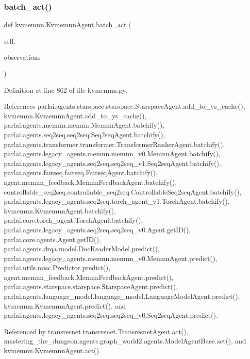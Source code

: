 \subsubsection{\texorpdfstring{batch\+\_\+act()}{batch\_act()}}
{\footnotesize\ttfamily def kvmemnn.\+Kvmemnn\+Agent.\+batch\+\_\+act (\begin{DoxyParamCaption}\item[{}]{self,  }\item[{}]{observations }\end{DoxyParamCaption})}



Definition at line 862 of file kvmemnn.\+py.



References parlai.\+agents.\+starspace.\+starspace.\+Starspace\+Agent.\+add\+\_\+to\+\_\+ys\+\_\+cache(), kvmemnn.\+Kvmemnn\+Agent.\+add\+\_\+to\+\_\+ys\+\_\+cache(), parlai.\+agents.\+memnn.\+memnn.\+Memnn\+Agent.\+batchify(), parlai.\+agents.\+seq2seq.\+seq2seq.\+Seq2seq\+Agent.\+batchify(), parlai.\+agents.\+transformer.\+transformer.\+Transformer\+Ranker\+Agent.\+batchify(), parlai.\+agents.\+legacy\+\_\+agents.\+memnn.\+memnn\+\_\+v0.\+Memnn\+Agent.\+batchify(), parlai.\+agents.\+legacy\+\_\+agents.\+seq2seq.\+seq2seq\+\_\+v1.\+Seq2seq\+Agent.\+batchify(), parlai.\+agents.\+fairseq.\+fairseq.\+Fairseq\+Agent.\+batchify(), agent.\+memnn\+\_\+feedback.\+Memnn\+Feedback\+Agent.\+batchify(), controllable\+\_\+seq2seq.\+controllable\+\_\+seq2seq.\+Controllable\+Seq2seq\+Agent.\+batchify(), parlai.\+agents.\+legacy\+\_\+agents.\+seq2seq.\+torch\+\_\+agent\+\_\+v1.\+Torch\+Agent.\+batchify(), kvmemnn.\+Kvmemnn\+Agent.\+batchify(), parlai.\+core.\+torch\+\_\+agent.\+Torch\+Agent.\+batchify(), parlai.\+agents.\+legacy\+\_\+agents.\+seq2seq.\+seq2seq\+\_\+v0.\+Agent.\+get\+I\+D(), parlai.\+core.\+agents.\+Agent.\+get\+I\+D(), parlai.\+agents.\+drqa.\+model.\+Doc\+Reader\+Model.\+predict(), parlai.\+agents.\+legacy\+\_\+agents.\+memnn.\+memnn\+\_\+v0.\+Memnn\+Agent.\+predict(), parlai.\+utils.\+misc.\+Predictor.\+predict(), agent.\+memnn\+\_\+feedback.\+Memnn\+Feedback\+Agent.\+predict(), parlai.\+agents.\+starspace.\+starspace.\+Starspace\+Agent.\+predict(), parlai.\+agents.\+language\+\_\+model.\+language\+\_\+model.\+Language\+Model\+Agent.\+predict(), kvmemnn.\+Kvmemnn\+Agent.\+predict(), and parlai.\+agents.\+legacy\+\_\+agents.\+seq2seq.\+seq2seq\+\_\+v0.\+Seq2seq\+Agent.\+predict().



Referenced by transresnet.\+transresnet.\+Transresnet\+Agent.\+act(), mastering\+\_\+the\+\_\+dungeon.\+agents.\+graph\+\_\+world2.\+agents.\+Model\+Agent\+Base.\+act(), and kvmemnn.\+Kvmemnn\+Agent.\+act().

